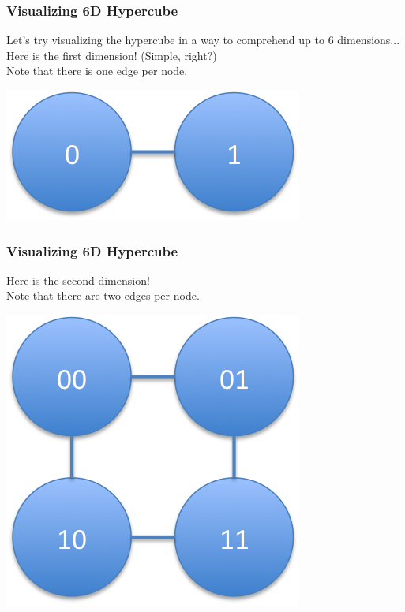 \documentclass[9pt]{beamer}
\begin{document}
\begin{frame}[fragile]
  \frametitle{Visualizing 6D Hypercube}
Let's try visualizing the hypercube in a way to comprehend up to 6 dimensions...\\
Here is the first dimension! (Simple, right?)\\
Note that there is one edge per node.
\begin{center}
  \includegraphics[scale=1]{1d_hypercube}
\end{center}
\end{frame}
\begin{frame}[fragile]
  \frametitle{Visualizing 6D Hypercube}
Here is the second dimension!\\
Note that there are two edges per node.
\begin{center}
  \includegraphics[scale=1]{2d_hypercube}
\end{center}
\end{frame}
\end{document}
